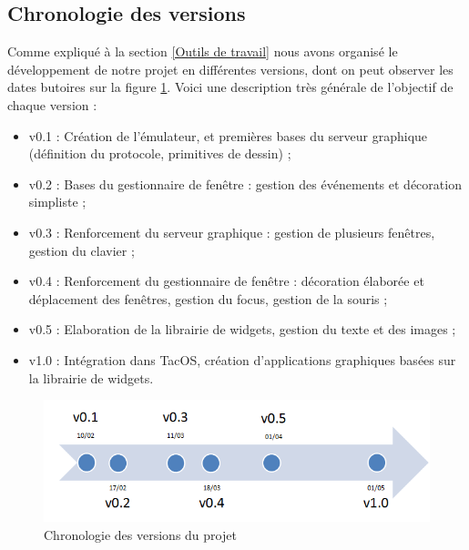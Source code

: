 \subsection{Chronologie des versions}
Comme expliqué à la section \ref{Outils de travail} nous avons organisé le développement de notre projet en différentes versions, dont on peut observer les dates butoires sur la figure \ref{fig:chrono}. Voici une description très générale de l'objectif de chaque version :
\begin{itemize}
\renewcommand{\labelitemi}{$\bullet$}
\item v0.1 : Création de l'émulateur, et premières bases du serveur graphique (définition du protocole, primitives de dessin) ;
\item v0.2 : Bases du gestionnaire de fenêtre : gestion des événements et décoration simpliste ;
\item v0.3 : Renforcement du serveur graphique : gestion de plusieurs fenêtres, gestion du clavier ;
\item v0.4 : Renforcement du gestionnaire de fenêtre : décoration élaborée et déplacement des fenêtres, gestion du focus, gestion de la souris ;
\item v0.5 : Elaboration de la librairie de widgets, gestion du texte et des images ;
\item v1.0 : Intégration dans TacOS, création d'applications graphiques basées sur la librairie de widgets.
\end{itemize}


\begin{figure}[H!]
  \centering
    \includegraphics[width=15cm]{figures/chrono}
  \caption{\label{fig:chrono}Chronologie des versions du projet}
\end{figure}

